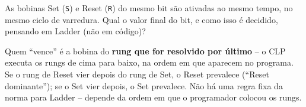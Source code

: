 \question[4] As bobinas Set (\texttt{S}) e Reset (\texttt{R}) do mesmo bit são ativadas ao mesmo tempo, no mesmo ciclo de varredura. Qual o valor final do bit, e como isso é decidido, pensando em Ladder (não em código)?

\begin{solution}
Quem ``vence'' é a bobina do \textbf{rung que for resolvido por último} -- o CLP executa os rungs de cima para baixo, na ordem em que aparecem no programa. Se o rung de Reset vier depois do rung de Set, o Reset prevalece (``Reset dominante''); se o Set vier depois, o Set prevalece. Não há uma regra fixa da norma para Ladder -- depende da ordem em que o programador colocou os rungs.
\end{solution}
